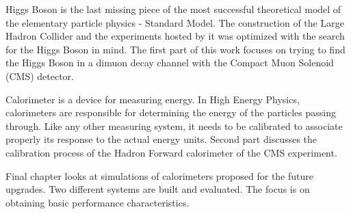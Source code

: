 Higgs Boson is the last missing piece of the most successful theoretical model of the elementary particle physics - Standard Model. The construction of the Large Hadron Collider and the experiments hosted by it was optimized with the search for the Higgs Boson in mind. The first part of this work focuses on trying to find the Higgs Boson in a dimuon decay channel with the Compact Muon Solenoid (CMS) detector.


Calorimeter is a device for measuring energy. In High Energy Physics, calorimeters are responsible for determining the energy of the particles passing through. Like any other measuring system, it needs to be calibrated to associate properly its response to the actual energy units. Second part discusses the calibration process of the Hadron Forward calorimeter of the CMS experiment.

Final chapter looks at simulations of calorimeters proposed for the future upgrades. Two different systems are built and evaluated. The focus is on obtaining basic performance characteristics.

